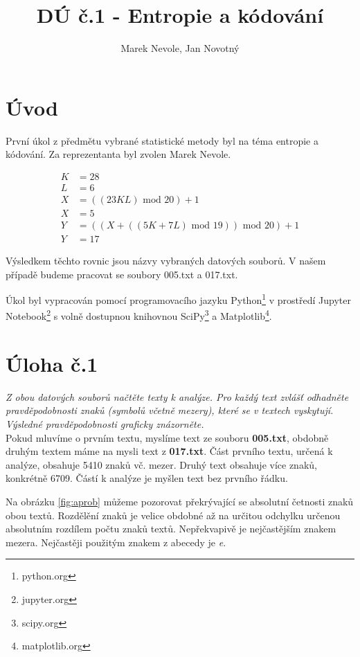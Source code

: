 \documentclass[czech]{mvi-report}
\title{DÚ č.1 - Entropie a kódování}
\author{Marek Nevole, Jan Novotný}
\affiliation{ČVUT - FIT}
\begin{document}
\maketitle

\section{Úvod}
První úkol z předmětu vybrané statistické metody byl na téma entropie a kódování. Za reprezentanta byl zvolen Marek Nevole.

\begin{align*}
  K &= 28\\
  L &= 6\\
  X &= ((23KL)\text{ mod }20) + 1\\
  X &= 5\\
  Y &= ((X + ((5K + 7L)\text{ mod }19))\text{ mod }20) + 1\\
  Y &= 17
\end{align*}

Výsledkem těchto rovnic jsou názvy vybraných datových souborů. V našem případě budeme pracovat se soubory 005.txt a 017.txt.

Úkol byl vypracován pomocí programovacího jazyku Python\footnote{python.org} v prostředí Jupyter Notebook\footnote{jupyter.org} s volně dostupnou knihovnou SciPy\footnote{scipy.org} a Matplotlib\footnote{matplotlib.org}.

\section{Úloha č.1}
\textit{Z obou datových souborů načtěte texty k analýze. Pro každý text zvlášť odhadněte pravděpodobnosti znaků (symbolů včetně mezery), které se v textech vyskytují. Výsledné pravděpodobnosti graficky znázorněte.}\\

Pokud mluvíme o prvním textu, myslíme text ze souboru \textbf{005.txt}, obdobně druhým textem máme na mysli text z \textbf{017.txt}. Část prvního textu, určená k analýze, obsahuje 5410 znaků vč. mezer. Druhý text obsahuje více znaků, konkrétně 6709. Částí k analýze je myšlen text bez prvního řádku.

Na obrázku \ref{fig:aprob} můžeme pozorovat překrývající se absolutní četnosti znaků obou textů. Rozdělění znaků je velice obdobné až na určitou odchylku určenou absolutním rozdílem počtu znaků textů. Nepřekvapivě je nejčastějším znakem mezera. Nejčastěji použitým znakem z abecedy je \textit{e}.
\end{document}
